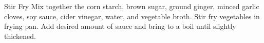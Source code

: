 \documentclass[../cookbook.tex]{subfiles}
\begin{document}
\begin{recipe}{Stir Fry}{}{}
    Mix together the corn starch, brown sugar, ground ginger, minced garlic
    cloves, soy sauce, cider vinegar, water, and vegetable broth.
    Stir fry vegetables in frying pan. Add desired amount of sauce and bring to
    a boil until slightly thickened.
\end{recipe}
\end{document}
